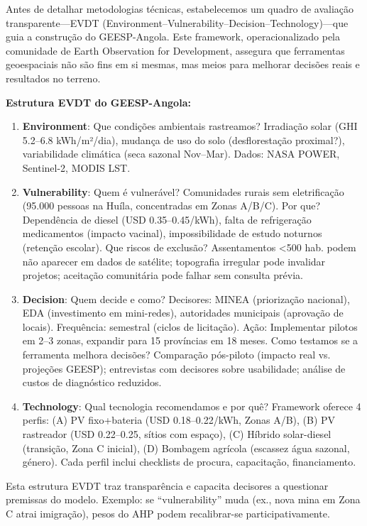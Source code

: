 \documentclass[12pt, a4paper]{article}
\begin{document}
Antes de detalhar metodologias técnicas, estabelecemos um quadro de avaliação transparente—EVDT (Environment–Vulnerability–Decision–Technology)—que guia a construção do GEESP-Angola. Este framework, operacionalizado pela comunidade de Earth Observation for Development, assegura que ferramentas geoespaciais não são fins em si mesmas, mas meios para melhorar decisões reais e resultados no terreno.

\textbf{Estrutura EVDT do GEESP-Angola:}

\begin{enumerate}
\item \textbf{Environment}: Que condições ambientais rastreamos? Irradiação solar (GHI 5.2--6.8 kWh/m²/dia), mudança de uso do solo (desflorestação proximal?), variabilidade climática (seca sazonal Nov--Mar). Dados: NASA POWER, Sentinel-2, MODIS LST.

\item \textbf{Vulnerability}: Quem é vulnerável? Comunidades rurais sem eletrificação (95.000 pessoas na Huíla, concentradas em Zonas A/B/C). Por que? Dependência de diesel (USD 0.35--0.45/kWh), falta de refrigeração medicamentos (impacto vacinal), impossibilidade de estudo noturnos (retenção escolar). Que riscos de exclusão? Assentamentos <500 hab. podem não aparecer em dados de satélite; topografia irregular pode invalidar projetos; aceitação comunitária pode falhar sem consulta prévia.

\item \textbf{Decision}: Quem decide e como? Decisores: MINEA (priorização nacional), EDA (investimento em mini-redes), autoridades municipais (aprovação de locais). Frequência: semestral (ciclos de licitação). Ação: Implementar pilotos em 2--3 zonas, expandir para 15 províncias em 18 meses. Como testamos se a ferramenta melhora decisões? Comparação pós-piloto (impacto real vs. projeções GEESP); entrevistas com decisores sobre usabilidade; análise de custos de diagnóstico reduzidos.

\item \textbf{Technology}: Qual tecnologia recomendamos e por quê? Framework oferece 4 perfis: (A) PV fixo+bateria (USD 0.18--0.22/kWh, Zonas A/B), (B) PV rastreador (USD 0.22--0.25, sítios com espaço), (C) Híbrido solar-diesel (transição, Zona C inicial), (D) Bombagem agrícola (escassez água sazonal, género). Cada perfil inclui checklists de procura, capacitação, financiamento.
\end{enumerate}

Esta estrutura EVDT traz transparência e capacita decisores a questionar premissas do modelo. Exemplo: se ``vulnerability'' muda (ex., nova mina em Zona C atrai imigração), pesos do AHP podem recalibrar-se participativamente.
\end{document}
